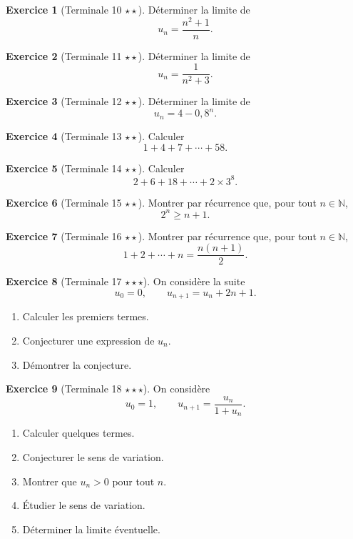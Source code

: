 \documentclass[11pt,a4paper]{article}
\theoremstyle{definition}
\newtheorem{exercice}{Exercice}[section]
\newcommand{\N}{\mathbb{N}}
\newcommand{\etoile}[1]{\hfill{\small\textbf{#1}}}
\begin{document}
\begin{exercice}[Terminale 10 \etoile{$\star\star$}]
Déterminer la limite de
\[
u_n=\frac{n^2+1}{n}.
\]
\end{exercice}

\begin{exercice}[Terminale 11 \etoile{$\star\star$}]
Déterminer la limite de
\[
u_n=\frac{1}{n^2+3}.
\]
\end{exercice}

\begin{exercice}[Terminale 12 \etoile{$\star\star$}]
Déterminer la limite de
\[
u_n=4-0{,}8^n.
\]
\end{exercice}

\begin{exercice}[Terminale 13 \etoile{$\star\star$}]
Calculer
\[
1+4+7+\cdots+58.
\]
\end{exercice}

\begin{exercice}[Terminale 14 \etoile{$\star\star$}]
Calculer
\[
2+6+18+\cdots+2\times 3^8.
\]
\end{exercice}

\begin{exercice}[Terminale 15 \etoile{$\star\star$}]
Montrer par récurrence que, pour tout $n\in\N$,
\[
2^n\ge n+1.
\]
\end{exercice}

\begin{exercice}[Terminale 16 \etoile{$\star\star$}]
Montrer par récurrence que, pour tout $n\in\N$,
\[
1+2+\cdots+n=\frac{n(n+1)}2.
\]
\end{exercice}

\begin{exercice}[Terminale 17 \etoile{$\star\star\star$}]
On considère la suite
\[
u_0=0,\qquad u_{n+1}=u_n+2n+1.
\]
\begin{enumerate}[label=\arabic*.]
    \item Calculer les premiers termes.
    \item Conjecturer une expression de $u_n$.
    \item Démontrer la conjecture.
\end{enumerate}
\end{exercice}

\begin{exercice}[Terminale 18 \etoile{$\star\star\star$}]
On considère
\[
u_0=1,\qquad u_{n+1}=\frac{u_n}{1+u_n}.
\]
\begin{enumerate}[label=\arabic*.]
    \item Calculer quelques termes.
    \item Conjecturer le sens de variation.
    \item Montrer que $u_n>0$ pour tout $n$.
    \item Étudier le sens de variation.
    \item Déterminer la limite éventuelle.
\end{enumerate}
\end{exercice}
\end{document}
